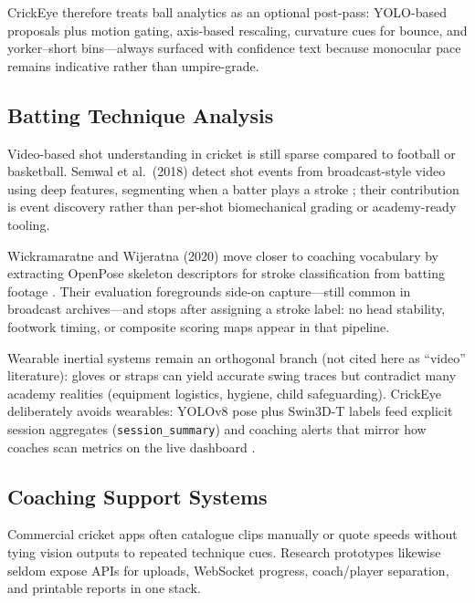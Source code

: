 \begin{justify}
\par CrickEye therefore treats ball analytics as an optional post-pass: YOLO-based proposals plus motion gating, axis-based rescaling, curvature cues for bounce, and yorker--short bins---always surfaced with confidence text because monocular pace remains indicative rather than umpire-grade.

\subsection{Batting Technique Analysis}

\par Video-based shot understanding in cricket is still sparse compared to football or basketball. Semwal et al.\ (2018) detect shot events from broadcast-style video using deep features, segmenting when a batter plays a stroke \cite{Semwal2018}; their contribution is event discovery rather than per-shot biomechanical grading or academy-ready tooling.

\par Wickramaratne and Wijeratna (2020) move closer to coaching vocabulary by extracting OpenPose skeleton descriptors for stroke classification from batting footage \cite{Wickramaratne2020}. Their evaluation foregrounds side-on capture---still common in broadcast archives---and stops after assigning a stroke label: no head stability, footwork timing, or composite scoring maps appear in that pipeline.

\par Wearable inertial systems remain an orthogonal branch (not cited here as ``video'' literature): gloves or straps can yield accurate swing traces but contradict many academy realities (equipment logistics, hygiene, child safeguarding). CrickEye deliberately avoids wearables: YOLOv8 pose plus Swin3D-T labels feed explicit session aggregates (\texttt{session\_summary}) and coaching alerts that mirror how coaches scan metrics on the live dashboard \cite{YOLOv8,Liu2022Swin3D}.

\subsection{Coaching Support Systems}

\par Commercial cricket apps often catalogue clips manually or quote speeds without tying vision outputs to repeated technique cues. Research prototypes likewise seldom expose APIs for uploads, WebSocket progress, coach/player separation, and printable reports in one stack.


\end{justify}
